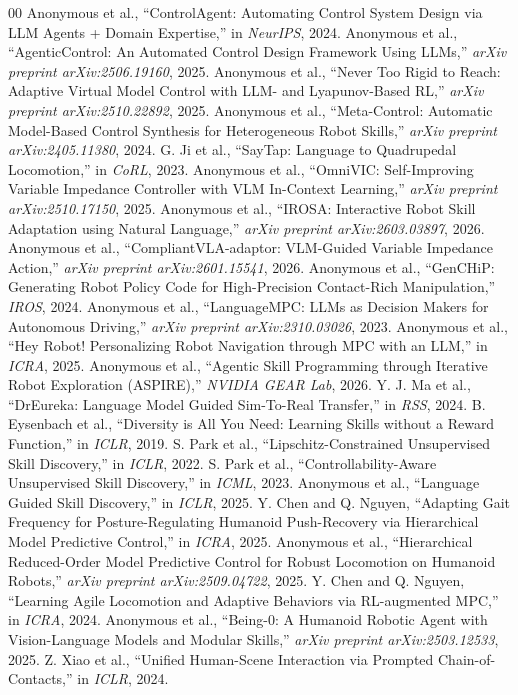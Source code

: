 \begin{thebibliography}{00}
 Anonymous et al., ``ControlAgent: Automating Control System Design via LLM Agents + Domain Expertise,'' in \textit{NeurIPS}, 2024.
 Anonymous et al., ``AgenticControl: An Automated Control Design Framework Using LLMs,'' \textit{arXiv preprint arXiv:2506.19160}, 2025.
 Anonymous et al., ``Never Too Rigid to Reach: Adaptive Virtual Model Control with LLM- and Lyapunov-Based RL,'' \textit{arXiv preprint arXiv:2510.22892}, 2025.
 Anonymous et al., ``Meta-Control: Automatic Model-Based Control Synthesis for Heterogeneous Robot Skills,'' \textit{arXiv preprint arXiv:2405.11380}, 2024.
 G. Ji et al., ``SayTap: Language to Quadrupedal Locomotion,'' in \textit{CoRL}, 2023.
 Anonymous et al., ``OmniVIC: Self-Improving Variable Impedance Controller with VLM In-Context Learning,'' \textit{arXiv preprint arXiv:2510.17150}, 2025.
 Anonymous et al., ``IROSA: Interactive Robot Skill Adaptation using Natural Language,'' \textit{arXiv preprint arXiv:2603.03897}, 2026.
 Anonymous et al., ``CompliantVLA-adaptor: VLM-Guided Variable Impedance Action,'' \textit{arXiv preprint arXiv:2601.15541}, 2026.
 Anonymous et al., ``GenCHiP: Generating Robot Policy Code for High-Precision Contact-Rich Manipulation,'' \textit{IROS}, 2024.
 Anonymous et al., ``LanguageMPC: LLMs as Decision Makers for Autonomous Driving,'' \textit{arXiv preprint arXiv:2310.03026}, 2023.
 Anonymous et al., ``Hey Robot! Personalizing Robot Navigation through MPC with an LLM,'' in \textit{ICRA}, 2025.
 Anonymous et al., ``Agentic Skill Programming through Iterative Robot Exploration (ASPIRE),'' \textit{NVIDIA GEAR Lab}, 2026.
 Y. J. Ma et al., ``DrEureka: Language Model Guided Sim-To-Real Transfer,'' in \textit{RSS}, 2024.
 B. Eysenbach et al., ``Diversity is All You Need: Learning Skills without a Reward Function,'' in \textit{ICLR}, 2019.
 S. Park et al., ``Lipschitz-Constrained Unsupervised Skill Discovery,'' in \textit{ICLR}, 2022.
 S. Park et al., ``Controllability-Aware Unsupervised Skill Discovery,'' in \textit{ICML}, 2023.
 Anonymous et al., ``Language Guided Skill Discovery,'' in \textit{ICLR}, 2025.
 Y. Chen and Q. Nguyen, ``Adapting Gait Frequency for Posture-Regulating Humanoid Push-Recovery via Hierarchical Model Predictive Control,'' in \textit{ICRA}, 2025.
 Anonymous et al., ``Hierarchical Reduced-Order Model Predictive Control for Robust Locomotion on Humanoid Robots,'' \textit{arXiv preprint arXiv:2509.04722}, 2025.
 Y. Chen and Q. Nguyen, ``Learning Agile Locomotion and Adaptive Behaviors via RL-augmented MPC,'' in \textit{ICRA}, 2024.
 Anonymous et al., ``Being-0: A Humanoid Robotic Agent with Vision-Language Models and Modular Skills,'' \textit{arXiv preprint arXiv:2503.12533}, 2025.
 Z. Xiao et al., ``Unified Human-Scene Interaction via Prompted Chain-of-Contacts,'' in \textit{ICLR}, 2024.
\end{thebibliography}
